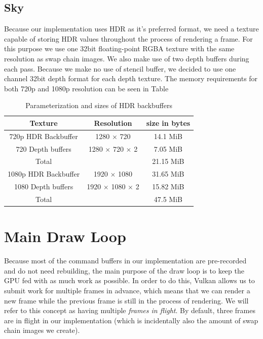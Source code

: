 \documentclass{ctuthesis}
\begin{document}
\subsection{Sky}
Because our implementation uses HDR as it's preferred format, we need a texture capable of
storing HDR values throughout the process of rendering a frame. For this purpose we use
one 32bit floating-point RGBA texture with the same resolution as swap chain images.
We also make use of two depth buffers during each pass. Because we make no use of stencil buffer,
we decided to use one channel 32bit depth format for each depth texture. The memory requirements
for both 720p and 1080p resolution can be seen in Table

\begin{center}
\begin{table}[H]
\begin{tabular}{ ||c|c|c|| } 
\hline
Texture & Resolution & size in bytes \\
\hline
720p HDR Backbuffer & 1280 $\times$ 720 & 14.1 MiB \\
\hline
720 Depth buffers & 1280 $\times$ 720 $\times$ 2 & 7.05 MiB \\
\hline 
Total & & 21.15 MiB \\
\hline
\hline
1080p HDR Backbuffer & 1920 $\times$ 1080 & 31.65 MiB \\
\hline
1080 Depth buffers & 1920 $\times$ 1080 $\times$ 2 & 15.82 MiB \\
\hline 
Total & & 47.5 MiB \\
\hline
\end{tabular}
\caption[HDR backbuffer sizes]{\label{tab:Backbuffers} Parameterization and sizes of HDR backbuffers}
\end{table}
\end{center}

\section{Main Draw Loop}
\label{Main draw loop}
Because most of the command buffers in our implementation are pre-recorded and do not need
rebuilding, the main purpose of the draw loop is to keep the GPU fed with as much work as possible. 
In order to do this, Vulkan allows us to submit work for multiple frames in advance, which means that
we can render a new frame while the previous frame is still in the process of rendering.
We will refer to this concept as having multiple \textit{frames in flight}. By default, three frames
are in flight in our implementation (which is incidentally also the amount of swap chain images we create).
\end{document}
